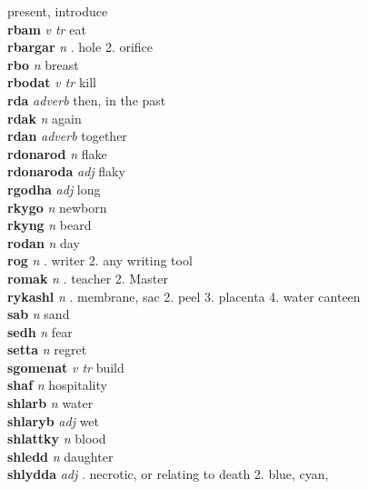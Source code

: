 present, introduce\\\textbf{rbam}   \emph{v tr} \textperiodcentered eat\\\textbf{rbargar}   \emph{n} . hole 2. orifice \\\textbf{rbo}   \emph{n} \textperiodcentered breast\\\textbf{rbodat}   \emph{v tr} \textperiodcentered kill\\\textbf{rda}   \emph{adverb} \textperiodcentered then, in the past\\\textbf{rdak}   \emph{n} \textperiodcentered again\\\textbf{rdan}   \emph{adverb} \textperiodcentered together\\\textbf{rdonarod}   \emph{n} \textperiodcentered flake\\\textbf{rdonaroda}   \emph{adj} \textperiodcentered flaky\\\textbf{rgodha}   \emph{adj} \textperiodcentered long\\\textbf{rkygo}   \emph{n} \textperiodcentered newborn\\\textbf{rkyng}   \emph{n} \textperiodcentered beard\\\textbf{rodan}   \emph{n} \textperiodcentered day\\\textbf{rog}   \emph{n} . writer 2. any writing tool \\\textbf{romak}   \emph{n} . teacher 2. Master \\\textbf{rykashl}   \emph{n} . membrane, sac 2. peel 3. placenta 4. water canteen \\\textbf{sab}   \emph{n} \textperiodcentered sand\\\textbf{sedh}   \emph{n} \textperiodcentered fear\\\textbf{setta}   \emph{n} \textperiodcentered regret\\\textbf{sgomenat}   \emph{v tr} \textperiodcentered build\\\textbf{shaf}   \emph{n} \textperiodcentered hospitality\\\textbf{shlarb}   \emph{n} \textperiodcentered water\\\textbf{shlaryb}   \emph{adj} \textperiodcentered wet\\\textbf{shlattky}   \emph{n} \textperiodcentered blood\\\textbf{shledd}   \emph{n} \textperiodcentered daughter\\\textbf{shlydda}   \emph{adj} . necrotic, or relating to death 2. blue, cyan, 